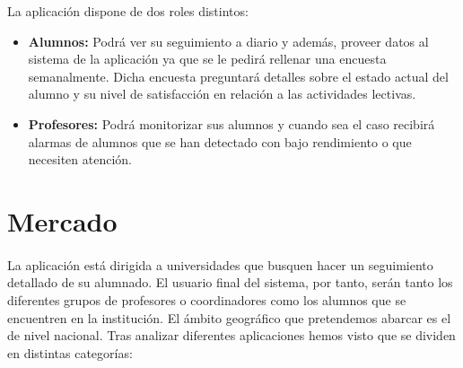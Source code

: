 La aplicación dispone de dos roles distintos:
\begin{itemize}
\item \textbf{Alumnos:} Podrá ver su seguimiento a diario y además,
  proveer datos al sistema de la aplicación ya que se le pedirá
  rellenar una encuesta semanalmente. Dicha encuesta preguntará
  detalles sobre el estado actual del alumno y su nivel de
  satisfacción en relación a las actividades lectivas.

\item \textbf{Profesores:} Podrá monitorizar sus alumnos y cuando sea
  el caso recibirá alarmas de alumnos que se han detectado con bajo
  rendimiento o que necesiten atención.
\end{itemize}

\section{Mercado}

\paragraph{}
La aplicación está dirigida a universidades que busquen hacer un
seguimiento detallado de su alumnado. El usuario final del sistema,
por tanto, serán tanto los diferentes grupos de profesores o
coordinadores como los alumnos que se encuentren en la institución. El
ámbito geográfico que pretendemos abarcar es el de nivel
nacional. Tras analizar diferentes aplicaciones hemos visto que se
dividen en distintas categorías:

